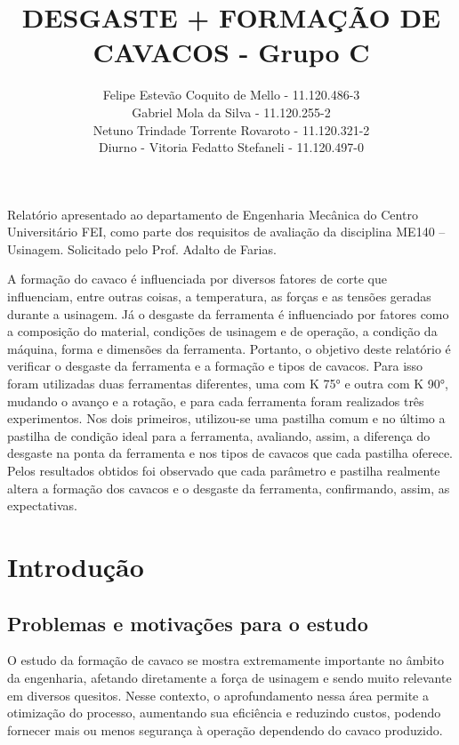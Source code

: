 \documentclass[deposito, acronym, symbols]{fei}
\title{DESGASTE + FORMAÇÃO DE CAVACOS - Grupo C}
\author{ Felipe Estevão Coquito de Mello - 11.120.486-3 \\ Gabriel Mola da Silva - 11.120.255-2 \\ Netuno Trindade Torrente Rovaroto - 11.120.321-2 \\ Diurno - Vitoria Fedatto Stefaneli - 11.120.497-0}
\begin{document}
\maketitle

\begin{folhaderosto}
	Relatório apresentado ao departamento de Engenharia Mecânica do Centro Universitário FEI, como parte dos requisitos de avaliação da disciplina ME140 – Usinagem. Solicitado pelo Prof. Adalto de Farias.
\end{folhaderosto}

\tableofcontents
\listoffigures
\listoftables

\begin{resumo}

A formação do cavaco é influenciada por diversos fatores de corte que influenciam, entre outras coisas, a temperatura, as forças e as tensões geradas durante a usinagem. Já o desgaste da ferramenta é influenciado por fatores como a composição do material, condições de usinagem e de operação, a condição da máquina, forma e dimensões da ferramenta. Portanto, o objetivo deste relatório é verificar o desgaste da ferramenta e a formação e tipos de cavacos. Para isso foram utilizadas duas ferramentas diferentes, uma com K 75° e outra com K 90°, mudando o avanço e a rotação, e para cada ferramenta foram realizados três experimentos. Nos dois primeiros, utilizou-se uma pastilha comum e no último a pastilha de condição ideal para a ferramenta, avaliando, assim, a diferença do desgaste na ponta da ferramenta e nos tipos de cavacos que cada pastilha oferece. Pelos resultados obtidos foi observado que cada parâmetro e pastilha realmente altera a formação dos cavacos e o desgaste da ferramenta, confirmando, assim, as expectativas.


\end{resumo}

\chapter{Introdução}

\section{Problemas e motivações para o estudo}

O estudo da formação de cavaco se mostra extremamente importante no âmbito da engenharia, afetando diretamente a força de usinagem e sendo muito relevante em diversos quesitos. Nesse contexto, o aprofundamento nessa área permite a otimização do processo, aumentando sua eficiência e reduzindo custos, podendo fornecer mais ou menos segurança à operação dependendo do cavaco produzido.
	
\end{document}
